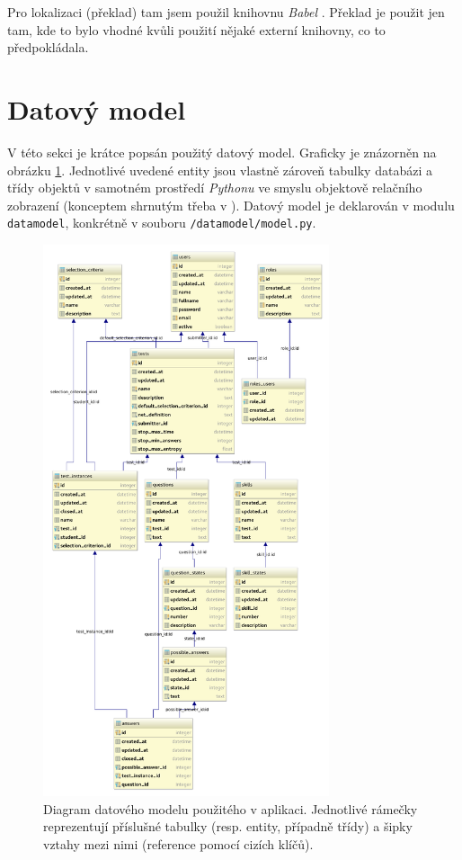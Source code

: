 \documentclass[a4paper,twoside,12pt]{scrbook}
\begin{document}
Pro lokalizaci (překlad) tam jsem použil knihovnu \textit{Babel} \cite{babel}. Překlad je použit jen tam, kde to bylo vhodné kvůli použití nějaké externí knihovny, co to předpokládala.

\section{Datový model}
V této sekci je krátce popsán použitý datový model. Graficky je znázorněn na obrázku \ref{fig:data_model}. Jednotlivé uvedené entity jsou vlastně zároveň tabulky databázi a třídy objektů v samotném prostředí \textit{Pythonu} ve smyslu objektově relačního zobrazení (konceptem shrnutým třeba v \cite{ORM}). Datový model je deklarován v modulu \texttt{datamodel}, konkrétně v souboru \texttt{/datamodel/model.py}.

\begin{figure}
  \centering
    \includegraphics[width=0.75\textwidth]{data_model.pdf}
  \caption{Diagram datového modelu použitého v aplikaci. Jednotlivé rámečky reprezentují příslušné tabulky (resp. entity, případně třídy) a šipky vztahy mezi nimi (reference pomocí cizích klíčů).}
  \label{fig:data_model}
\end{figure}
\end{document}

